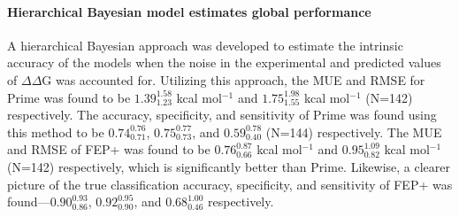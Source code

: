 \documentclass[phd,tocprelim]{cornell}
\begin{document}
\paragraph{Hierarchical Bayesian model estimates global performance}
A hierarchical Bayesian approach was developed to estimate the intrinsic accuracy of the models when the noise in the experimental and predicted values of $\Delta\Delta$G was accounted for.
Utilizing this approach, the MUE and RMSE for Prime was found to be $1.39^{1.58}_{1.23}$ kcal mol$^{-1}$ and $1.75^{1.98}_{1.55}$ kcal mol$^{-1}$ (N=142) respectively.
The accuracy, specificity, and sensitivity of Prime was found using this method to be $0.74^{0.76}_{0.71}$, $0.75^{0.77}_{0.73}$, and $0.59^{0.78}_{0.40}$ (N=144) respectively.
The MUE and RMSE of FEP+ was found to be $0.76^{0.87}_{0.66}$ kcal mol$^{-1}$ and $0.95^{1.09}_{0.82}$ kcal mol$^{-1}$ (N=142) respectively, which is significantly better than Prime.
Likewise, a clearer picture of the true classification accuracy, specificity, and sensitivity of FEP+ was found---$0.90^{0.93}_{0.86}$, $0.92^{0.95}_{0.90}$, and $0.68^{1.00}_{0.46}$ respectively.
\end{document}
